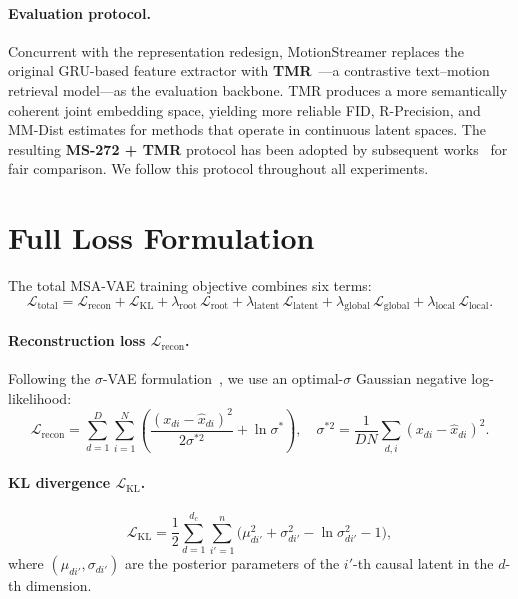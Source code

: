 \documentclass{article}
\begin{document}
\paragraph{Evaluation protocol.}
Concurrent with the representation redesign, MotionStreamer replaces the original GRU-based feature extractor with \textbf{TMR}~\citep{petrovich2023tmr}---a contrastive text--motion retrieval model---as the evaluation backbone.
TMR produces a more semantically coherent joint embedding space, yielding more reliable FID, R-Precision, and MM-Dist estimates for methods that operate in continuous latent spaces.
The resulting \textbf{MS-272 + TMR} protocol has been adopted by subsequent works~\citep{meng2024rethinking,meng2025absolute,fan2025go} for fair comparison.
We follow this protocol throughout all experiments.

\section{Full Loss Formulation}
\label{app:loss}

The total MSA-VAE training objective combines six terms:
\begin{equation}
\mathcal{L}_{\text{total}} = \mathcal{L}_{\text{recon}} + \mathcal{L}_{\text{KL}}
+ \lambda_{\text{root}}\,\mathcal{L}_{\text{root}}
+ \lambda_{\text{latent}}\,\mathcal{L}_{\text{latent}}
+ \lambda_{\text{global}}\,\mathcal{L}_{\text{global}}
+ \lambda_{\text{local}}\,\mathcal{L}_{\text{local}}.
\end{equation}

\paragraph{Reconstruction loss $\mathcal{L}_{\text{recon}}$.}
Following the $\sigma$-VAE formulation~\citep{rybkin2021simple}, we use an optimal-$\sigma$ Gaussian negative log-likelihood:
\begin{equation}
\mathcal{L}_{\text{recon}} = \sum_{d=1}^{D}\sum_{i=1}^{N}
\left(\frac{(x_{di}-\hat{x}_{di})^2}{2\sigma^{*2}} + \ln\sigma^{*}\right),
\quad
\sigma^{*2} = \frac{1}{DN}\sum_{d,i}(x_{di}-\hat{x}_{di})^2.
\end{equation}

\paragraph{KL divergence $\mathcal{L}_{\text{KL}}$.}
\begin{equation}
\mathcal{L}_{\text{KL}} = \frac{1}{2}\sum_{d=1}^{d_c}\sum_{i'=1}^{n}
\bigl(\mu_{di'}^2 + \sigma_{di'}^2 - \ln\sigma_{di'}^2 - 1\bigr),
\end{equation}
where $(\mu_{di'}, \sigma_{di'})$ are the posterior parameters of the $i'$-th causal latent in the $d$-th dimension.
\end{document}

